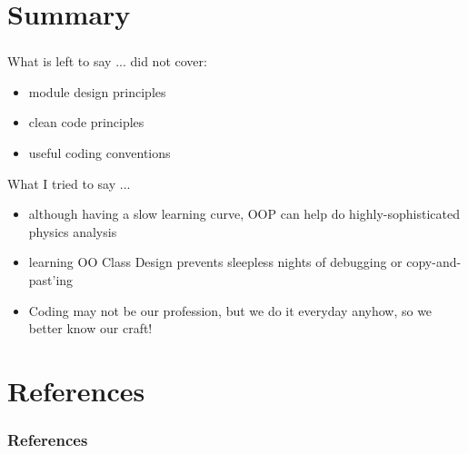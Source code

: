 \documentclass[9pt,handout]{beamer}
\begin{document}
\section{Summary}
\begin{frame}
  \frametitle{\secname}
  \begin{block}{What is left to say ...}
    did not cover:
    \begin{itemize}
    \item module design principles
    \item clean code principles
    \item useful coding conventions
    \end{itemize}
  \end{block}
\vfill
\pause
  \begin{block}{What I tried to say ...}
    \begin{itemize}
    \item although having a slow learning curve, OOP can help do highly-sophisticated physics analysis
    \item learning OO Class Design prevents sleepless nights of debugging or copy-and-past'ing
    \item Coding may not be our profession, but we do it everyday anyhow, so we better know our craft!
    \end{itemize}
  \end{block}
\end{frame}

\section{References}
\scriptsize
\begin{frame}
  \frametitle{References}
   
  
\end{frame}
\end{document}
